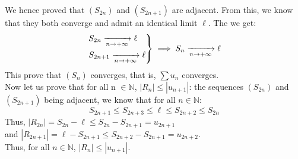 \documentclass[notitlepage]{math}
\begin{document}
\begin{enumerate}
 We hence proved that $(S_{2n})$ and $(S_{2n+1})$ are adjacent. From this, we know that they both converge and admit an identical limit $\ell$. The we get:
 \[ \begin{rcases}
    S_{2n} \xrightarrow[n \to +\infty]{} \ell\\
    S_{2n+1} \xrightarrow[n \to +\infty]{} \ell
 \end{rcases} \implies S_n \xrightarrow[n \to +\infty]{} \ell\]
 This prove that $(S_n)$ converges, that is, $\sum u_n$ converges.\\[0.5em]
 Now let us prove that for all n $\in \mathbb{N}$, $\left\lvert R_n \right\rvert \leq \left\lvert u_{n+1} \right\rvert$: the sequences $(S_{2n})$ and $(S_{2n+1})$ being adjacent, we know that for all $n \in \mathbb{N}$:
 \[ S_{2n+1} \leq S_{2n+3} \leq \ell \leq S_{2n+2} \leq S_{2n} \]
 Thus, $\left\lvert R_{2n} \right\rvert = S_{2n} - \ell \leq S_{2n} - S_{2n+1} = u_{2n+1}$\\[0.5em]
 and $\left\lvert R_{2n+1} \right\rvert = \ell - S_{2n+1} \leq S_{2n+2} - S_{2n+1} = u_{2n+2}$.\\[0.5em]
 Thus, for all $n \in \mathbb{N}$, $\left\lvert R_n \right\rvert \leq \left\lvert u_{n+1} \right\rvert$.
\end{enumerate}
\end{document}
